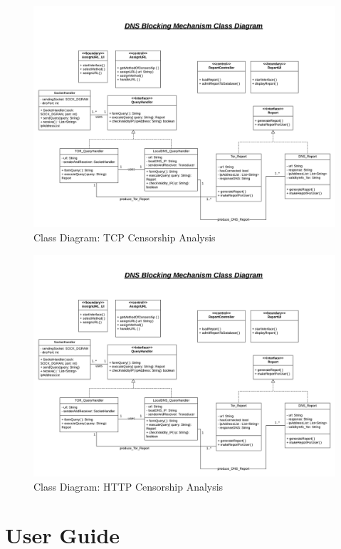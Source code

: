 \documentclass[12pt]{article}
\begin{document}
\begin{figure}[H]
    \centering
    \includegraphics[width=\textwidth]{Diagrams/cddns.png}
    \caption{Class Diagram: TCP Censorship Analysis}
    \label{fig:ucdns}
\end{figure}

\begin{figure}[H]
    \centering
    \includegraphics[width=\textwidth]{Diagrams/cddns.png}
    \caption{Class Diagram: HTTP Censorship Analysis}
    \label{fig:ucdns}
\end{figure}


\section{User Guide}
\end{document}
